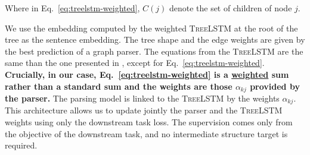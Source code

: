 Where in Eq.~\ref{eq:treelstm-weighted}, $C(j)$ denote the set of children of node $j$.


We use the embedding computed by the weighted \textsc{TreeLSTM} at the root of the tree as the sentence embedding.
The tree shape and the edge weights are given by the best prediction of a graph parser. The equations from the \textsc{TreeLSTM} are the same than the one presented in , except for Eq.~\ref{eq:treelstm-weighted}. \textbf{Crucially, in our case, Eq.~\ref{eq:treelstm-weighted} is a \underline{weighted} sum rather than a standard sum and the weights are those $\alpha_{kj}$ provided by the parser.} The parsing model is linked to the \textsc{TreeLSTM} by the weights $\alpha_{kj}$. This architecture allows us to update jointly the parser and the \textsc{TreeLSTM} weights using only the downstream task loss. The supervision comes only from the objective of the downstream task, and no intermediate structure target is required.

